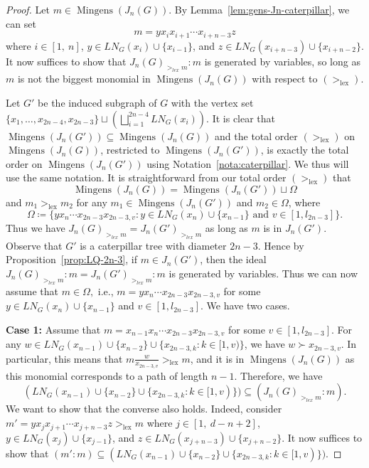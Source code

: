 \documentclass{amsart}
\theoremstyle{remark}
\theoremstyle{definition}
\DeclareMathOperator{\mingens}{Mingens}
\DeclareMathOperator{\lex}{lex}
\begin{document}
	\begin{proof}
		Let $m\in \mingens(J_n(G))$. By Lemma~\ref{lem:gens-Jn-caterpillar}, we can set \[m=yx_ix_{i+1}\cdots x_{i+n-3}z\]
		where $i\in [1,\ n]$, $y\in LN_G(x_i)\cup \{x_{i-1}\}$, and $z\in  LN_G(x_{i+n-3})\cup \{x_{i+n-2}\}$. It now suffices to show that $J_n(G)_{>_{lex}m} \colon m$ is generated by variables, so long as $m$ is not the biggest monomial in $\mingens(J_n(G))$ with respect to $(>_{\lex})$.
		
		Let $G'$ be the induced subgraph of $G$ with the vertex set $\{x_1,\dots, x_{2n-4},x_{2n-3}\}\sqcup \left( \bigsqcup_{i=1}^{2n-4} LN_G(x_i) \right)$. It is clear that $\mingens(J_n(G'))\subseteq \mingens(J_n(G))$ and the total order $(>_{\lex})$ on $\mingens(J_n(G))$, restricted to $\mingens(J_n(G'))$, is exactly the total order on $\mingens(J_n(G'))$ using Notation~\ref{nota:caterpillar}. We thus will use the same notation. It is straightforward  from our total order $(>_{\lex})$ that
		\[
		\mingens(J_n(G))= \mingens(J_n(G')) \sqcup \Omega
		\]
		and $m_1>_{\lex} m_2$ for any $m_1\in \mingens(J_n(G'))$ and $m_2\in \Omega$, where
		\[
		\Omega\coloneqq \{yx_{n}\cdots x_{2n-3}x_{2n-3,v}\colon y\in LN_G(x_{n})\cup \{x_{n-1}\} \text{ and } v\in [1,l_{2n-3}] \}.\]
		Thus we have $J_n(G)_{>_{lex}m}=J_n(G')_{>_{lex}m}$ as long as $m$ is in $J_n(G')$. Observe that $G'$ is a caterpillar tree with diameter $2n-3$. Hence by Proposition~\ref{prop:LQ-2n-3}, if $m\in J_n(G')$, then the ideal $J_n(G)_{>_{lex}m} \colon m = J_n(G')_{>_{lex}m} \colon m$ is generated by variables. Thus we can now assume that $m\in \Omega,$ i.e., $m= yx_{n}\cdots x_{2n-3}x_{2n-3,v}$
		for some $y\in LN_G(x_{n})\cup \{x_{n-1}\}$ and $v\in [1,l_{2n-3}]$. We have two cases. 
		
		\textbf{Case 1:} Assume that $m= x_{n-1} x_{n}\cdots x_{2n-3}x_{2n-3,v}$
		for some $v\in [1,l_{2n-3}]$. For any $w\in LN_G(x_{n-1}) \cup \{x_{n-2}\} \cup \{x_{2n-3,k}\colon k\in [1,v)\}$, we have $w\succ x_{2n-3,v}$. In particular, this means that  $m\frac{w}{x_{2n-3,v}} >_{\lex}  m$, and it is in $\mingens(J_n(G))$ as this monomial corresponds to a path of length $n-1$. Therefore, we have 
		\[
		(LN_G(x_{n-1}) \cup \{x_{n-2}\} \cup \{x_{2n-3,k}\colon k\in [1,v)\}) \subseteq (J_n(G)_{>_{lex}m} \colon m).
		\]
		We want to show that the converse also holds. Indeed, consider $m'=yx_jx_{j+1}\cdots x_{j+n-3}z>_{\lex}  m$ where $j\in [1,\ d-n+2]$, $y\in LN_G(x_j)\cup \{x_{j-1}\}$, and $z\in  LN_G(x_{j+n-3})\cup \{x_{j+n-2}\}$. It now suffices to show that $(m':m)\subseteq (LN_G(x_{n-1}) \cup \{x_{n-2}\} \cup \{x_{2n-3,k}\colon k\in [1,v)\})$.
		

\end{proof}
\end{document}
